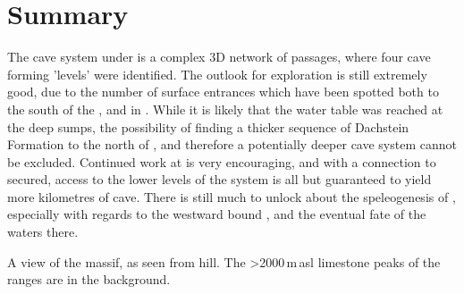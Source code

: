 \section{Summary}
The cave system under  is a complex 3D network of passages, where four cave forming 'levels' were identified. 
The outlook for exploration is still extremely good, due to the number of surface entrances which have been spotted both to the south of the , and in . 
While it is likely that the water table was reached at the deep  sumps, the possibility of finding a thicker sequence of Dachstein Formation to the north of , and therefore a potentially deeper cave system cannot be excluded. 
Continued work at  is very encouraging, and with a connection to  secured, access to the lower levels of the system is all but guaranteed to yield more kilometres of cave.
There is still much to unlock about the speleogenesis of , especially with regards to the westward bound , and the eventual fate of the waters there.

\begin{pagefigure}
\checkoddpage \ifoddpage \forcerectofloat \else \forceversofloat \fi
{}
\caption{A view of the  massif, as seen from  hill. The >2000\,m\,asl limestone peaks of the  ranges are in the background. }
\label{fig:massif_landscape}
\end{pagefigure}


